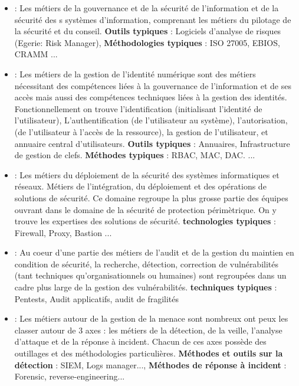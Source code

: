  \begin{itemize}
  \item \textbf{} : Les métiers de la gouvernance et de la sécurité de l'information et de la sécurité des s systèmes d'information, comprenant les métiers du pilotage de la sécurité et du conseil. \textbf{Outils typiques} : Logiciels d'analyse de risques (Egerie: Risk Manager),  \textbf{Méthodologies typiques} : ISO 27005, EBIOS, CRAMM ... %
  
  \item \textbf{ }: Les métiers de la gestion de l'identité numérique sont des métiers nécessitant des compétences liées à la gouvernance de l'information et de ses accès mais aussi des compétences techniques liées à la gestion des identités. Fonctionnellement on trouve l'identification (initialisant l'identité de l'utilisateur),  L’authentification (de l’utilisateur au système), l’autorisation, (de l'utilisateur à l'accès de la ressource), la gestion de l’utilisateur, et annuaire central d’utilisateurs. \textbf{Outils typiques} : Annuaires, Infrastructure de gestion de clefs.  \textbf{Méthodes typiques} : RBAC, MAC, DAC. ...
  \item \textbf{} : Les métiers du déploiement  de la sécurité des systèmes informatiques et réseaux. Métiers de l'intégration, du déploiement et des opérations de solutions de sécurité. Ce domaine regroupe la plus grosse partie des équipes ouvrant dans le domaine de la sécurité de protection périmètrique. On y trouve les expertises des solutions de sécurité.   \textbf{technologies typiques} :  Firewall, Proxy, Bastion ... 
  \item\textbf{ } : Au coeur d'une partie des métiers de l'audit et de la gestion du maintien en condition de sécurité, la recherche, détection, correction de vulnérabilités (tant techniques qu'organisationnels ou humaines) sont regroupées dans un cadre plus large de la gestion des vulnérabilités. \textbf{techniques typiques} : Pentests, Audit applicatifs, audit de fragilités
  \item \textbf{} : Les métiers autour de la gestion de la menace sont nombreux ont peux les classer  autour de 3 axes : les métiers de la détection, de la veille, l'analyse d'attaque et de la réponse à incident. Chacun de ces axes possède des outillages et des méthodologies particulières.  \textbf{Méthodes et outils sur la détection} : SIEM, Logs manager..., \textbf{Méthodes de réponse à incident} : Forensic, reverse-engineering...

\end{itemize}

